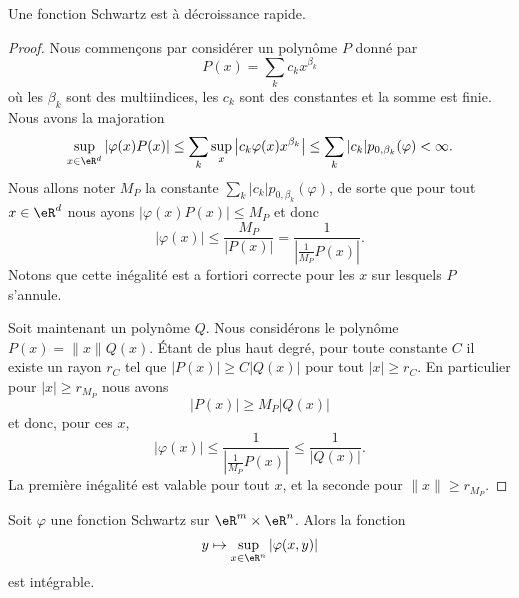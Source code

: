 \begin{proposition} \label{PropCSmzwGv}
	Une fonction Schwartz est à décroissance rapide.
\end{proposition}

\begin{proof}
	Nous commençons par considérer un polynôme \( P\) donné par
	\begin{equation}
		P(x)=\sum_kc_kx^{\beta_k}
	\end{equation}
	où les \( \beta_k\) sont des multiindices, les \( c_k\) sont des constantes et la somme est finie. Nous avons la majoration
	\begin{equation}
		\sup_{x\in \eR^d}| \varphi(x)P(x) |\leq\sum_k\sup_x\big| c_k\varphi(x) x^{\beta_k} \big|\leq\sum_k| c_k |p_{0,\beta_k}(\varphi)<\infty.
	\end{equation}
	Nous allons noter \( M_P\) la constante \( \sum_k| c_k |p_{0,\beta_k}(\varphi)\), de sorte que pour tout \( x\in \eR^d\) nous ayons \( | \varphi(x)P(x) |\leq M_P\) et donc
	\begin{equation}
		| \varphi(x) |\leq \frac{ M_P }{ | P(x) | }=\frac{1}{ | \frac{1}{ M_P }P(x) | }.
	\end{equation}
	Notons que cette inégalité est a fortiori correcte pour les \( x\) sur lesquels \( P\) s'annule.

	Soit maintenant un polynôme \( Q\). Nous considérons le polynôme \( P(x)=\| x \|Q(x)\). Étant de plus haut degré, pour toute constante \( C\) il existe un rayon \( r_C\) tel que \( | P(x) |\geq C| Q(x) |\) pour tout \( | x |\geq r_C\). En particulier pour \( | x |\geq r_{M_P}\) nous avons
	\begin{equation}
		| P(x) |\geq M_P| Q(x) |
	\end{equation}
	et donc, pour ces \( x\),
	\begin{equation}
		| \varphi(x) |\leq \frac{1}{ | \frac{1}{ M_P }P(x) | }\leq \frac{1}{ | Q(x) | }.
	\end{equation}
	La première inégalité est valable pour tout \( x\), et la seconde pour \( \| x \|\geq r_{M_P}\).
\end{proof}

\begin{corollary}        \label{CORooZFPSooHCFUSH}
	Soit \( \varphi\) une fonction Schwartz sur \( \eR^m\times \eR^n\). Alors la fonction
	\begin{equation}
		y\mapsto \sup_{x\in \eR^n}| \varphi(x,y) |
	\end{equation}
	est intégrable.
\end{corollary}

